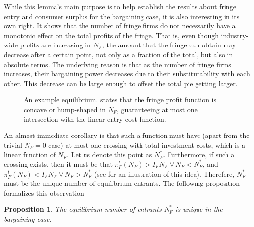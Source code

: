 \documentclass[a4paper]{article}
\newtheorem{proposition}{Proposition}
\begin{document}
While this lemma's main purpose is to help establish the results about fringe entry and consumer surplus for the bargaining case, it is also interesting in its own right.
It shows that the number of fringe firms do not necessarily have a monotonic effect on the total profits of the fringe.
That is, even though industry-wide profits are increasing in $N_F$, the amount that the fringe can obtain may decrease after a certain point, not only as a fraction of the total, but also in absolute terms.
The underlying reason is that as the number of fringe firms increases, their bargaining power decreases due to their substitutability with each other.
This decrease can be large enough to offset the total pie getting larger.

\begin{figure}[ht]
    \centering
    \caption{An example equilibrium.  states that the fringe profit function is concave or hump-shaped in $N_F$, guaranteeing at most one intersection with the linear entry cost function.}
    \label{fig:equilibrium}
\end{figure}

An almost immediate corollary is that such a function must have (apart from the trivial $N_F=0$ case) at most one crossing with total investment costs, which is a linear function of $N_F$.
Let us denote this point as $N_F^*$.
Furthermore, if such a crossing exists, then it must be that $\pi_F^t(N_F) > I_F N_F \;\forall\, N_F < N_F^*$, and $\pi_F^t(N_F) < I_F N_F \;\forall\, N_F > N_F^*$ (see  for an illustration of this idea).
Therefore, $N_F^*$ must be the unique number of equilibrium entrants.
The following proposition formalizes this observation.
\begin{proposition}
    \label{prop:unique_equilibrium}
    The equilibrium number of entrants $N_F^*$ is unique in the bargaining case.
\end{proposition}
\end{document}
